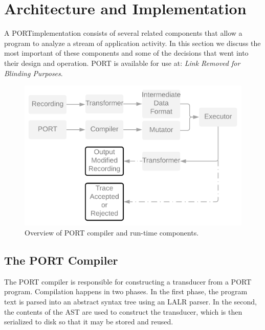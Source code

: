 \section{Architecture and Implementation}

A  PORTimplementation consists of several related
components that allow a program to analyze a stream of
application activity.
In this section we discuss the most important of these components and some
of the decisions that went into their design and operation.
PORT is available for use at: \textit{Link Removed for Blinding Purposes}.
\label{SEC:architecture}

\begin{figure}
\centering
  \includegraphics[scale=.19]{images/architecture}
  \caption{Overview of PORT compiler and run-time components.}
  \label{fig:architecture}
\end{figure}

\subsection{The PORT Compiler}

The PORT compiler is responsible for constructing a transducer
from a PORT program.
Compilation happens in two phases.  In the first phase, the program text is
parsed into an abstract syntax tree using an LALR parser.
In the second, the
contents of the AST are used to construct the transducer, which is then serialized to
disk so that it may be stored and reused.

